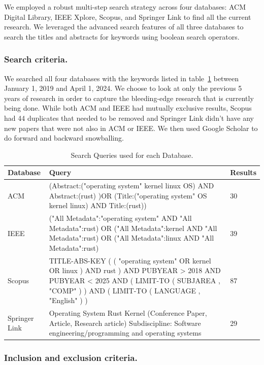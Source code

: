 \documentclass[sigconf]{acmart}
\begin{document}
We employed a robust multi-step search strategy across four databases: ACM Digital Library,
IEEE Xplore, Scopus, and Springer Link to find all the current research. 
We leveraged the advanced search features of all three databases to search the titles and abstracts for
keywords using boolean search operators.


\subsubsection{\textbf{Search criteria.}}

We searched all four databases with the keywords listed in table~\ref{tab:keywords} between January
1, 2019 and April 1, 2024. We choose to look at only the previous 5 years of research in order to capture the
bleeding-edge research that is currently being done. While both ACM and IEEE had mutually exclusive results, Scopus had 44
duplicates that needed to be removed and Springer Link didn't have any new papers that were not also in ACM or IEEE. We then used Google Scholar to do forward and backward snowballing. 

\begin{table}
\begin{tabular}{|| p{2cm}| p{4cm} | p{1cm} ||}
 \hline
 Database & Query & Results \\
 \hline\hline
 ACM  & (Abstract:("operating system" kernel linux OS) AND Abstract:(rust) )OR (Title:("operating
 system" OS kernel linux) AND Title:(rust))  & 30 \\
 IEEE & ("All Metadata":"operating system" AND "All Metadata":rust) OR ("All Metadata":kernel AND
 "All Metadata":rust) OR ("All Metadata":linux AND "All Metadata":rust) & 39 \\
 Scopus & TITLE-ABS-KEY ( ( "operating system" OR kernel OR linux ) AND rust ) AND PUBYEAR > 2018
 AND PUBYEAR < 2025 AND ( LIMIT-TO ( SUBJAREA , "COMP" ) ) AND ( LIMIT-TO ( LANGUAGE , "English" ) )
 & 87 \\
 Springer Link & Operating System Rust Kernel (Conference Paper, Article, Research article) Subdiscipline: Software engineering/programming and operating systems & 29 \\
 \hline
\end{tabular}
\caption{Search Queries used for each Database.}
\label{tab:keywords}
\end{table}

\subsubsection{\textbf{Inclusion and exclusion criteria.}}
\end{document}
